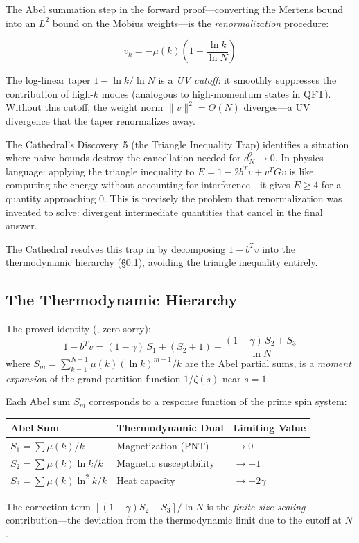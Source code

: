The Abel summation step in the forward proof---converting the Mertens
bound into an $L^2$ bound on the M\"obius weights---is the
\emph{renormalization} procedure:

\[
  v_k = -\mu(k)\left(1 - \frac{\ln k}{\ln N}\right)
\]

The log-linear taper $1 - \ln k / \ln N$ is a \emph{UV cutoff}: it
smoothly suppresses the contribution of high-$k$ modes (analogous to
high-momentum states in QFT). Without this cutoff, the weight norm
$\|v\|^2 = \Theta(N)$ diverges---a UV divergence that the taper
renormalizes away.

\begin{observation}
The Cathedral's Discovery~5 (the Triangle Inequality Trap) identifies
a situation where naive bounds destroy the cancellation needed for
$d_N^2 \to 0$. In physics language: applying the triangle inequality
to $E = 1 - 2b^Tv + v^TGv$ is like computing the energy without
accounting for interference---it gives $E \geq 4$ for a quantity
approaching $0$. This is precisely the problem that renormalization
was invented to solve: divergent intermediate quantities that cancel
in the final answer.

The Cathedral resolves this trap in  by
decomposing $1 - b^T v$ into the thermodynamic hierarchy (\S\ref{sec:thermo}),
avoiding the triangle inequality entirely.
\end{observation}

\subsection{The Thermodynamic Hierarchy}
\label{sec:thermo}

The proved identity (, zero sorry):
\[
  1 - b^T v
  = (1 - \gamma)\, S_1 + (S_2 + 1)
  - \frac{(1 - \gamma)\,S_2 + S_3}{\ln N}
\]
where $S_m = \sum_{k=1}^{N-1} \mu(k)(\ln k)^{m-1}/k$ are the Abel
partial sums, is a \emph{moment expansion} of the grand partition function
$1/\zeta(s)$ near $s = 1$.

\begin{correspondence}
  Each Abel sum $S_m$ corresponds to a response function of the prime
  spin system:
  \begin{center}
  \begin{tabular}{@{}lll@{}}
  \toprule
  \textbf{Abel Sum} & \textbf{Thermodynamic Dual} & \textbf{Limiting Value} \\
  \midrule
  $S_1 = \sum \mu(k)/k$ & Magnetization (PNT) & $\to 0$ \\
  $S_2 = \sum \mu(k)\ln k / k$ & Magnetic susceptibility & $\to -1$ \\
  $S_3 = \sum \mu(k)\ln^2 k / k$ & Heat capacity & $\to -2\gamma$ \\
  \bottomrule
  \end{tabular}
  \end{center}
  The correction term $[(1-\gamma)S_2 + S_3]/\ln N$ is the
  \emph{finite-size scaling} contribution---the deviation from the
  thermodynamic limit due to the cutoff at $N$.
\end{correspondence}

